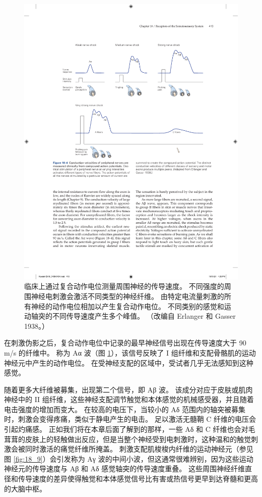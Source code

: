\begin{figure}[htbp]
	\centering
	\includegraphics[width=1.0\linewidth]{chap18/fig_18_4}
	\caption{临床上通过复合动作电位测量周围神经的传导速度。 
		不同强度的周围神经电刺激会激活不同类型的神经纤维。 
		由特定电流量刺激的所有神经的动作电位相加以产生复合动作电位。 不同类别的感觉和运动轴突的不同传导速度产生多个峰值。 （改编自 Erlanger 和 Gasser 1938。）}
	\label{fig:18_4}
\end{figure}


在刺激伪影之后，复合动作电位中记录的最早神经信号出现在传导速度大于 90 m/s 的纤维中。 
称为 Aα 波（图 \ref{fig:18_4}），该信号反映了 I 组纤维和支配骨骼肌的运动神经元中产生的动作电位。 
在受神经支配的区域中，受试者几乎无法感知到这种感觉。


随着更多大纤维被募集，出现第二个信号，即 Aβ 波。 
该成分对应于皮肤或肌肉神经中的 II 组纤维，这些神经支配调节触觉和本体感觉的机械感受器，并且随着电击强度的增加而变大。 
在较高的电压下，当较小的 Aδ 范围内的轴突被募集时，刺激会变得疼痛，类似于静电产生的电击。 
足以激活无髓鞘 C 纤维的电压会引起灼痛感。 
正如我们将在本章后面了解到的那样，一些 Aδ 和 C 纤维也会对毛茸茸的皮肤上的轻触做出反应，但是当整个神经受到电刺激时，这种温和的触觉刺激会被同时激活的痛觉纤维所掩盖。 
刺激支配肌梭梭内纤维的运动神经元（参见图 \ref{fig:18_9}）会引发称为 Aγ 波的中间小波，但这通常很难辨别，因为这些运动神经元的传导速度与 Aβ 和 Aδ 感觉轴突的传导速度重叠。
这些周围神经纤维直径和传导速度的差异使得触觉和本体感觉信号比有害或热信号更早到达脊髓和更高的大脑中枢。

